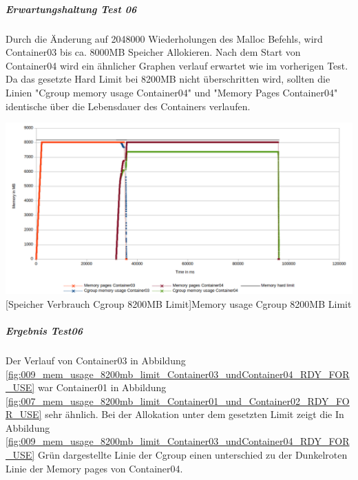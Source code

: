 \vspace{1em}


\subparagraph{Erwartungshaltung Test 06}
Durch die Änderung auf 2048000 Wiederholungen des Malloc Befehls, wird Container03 bis ca. 8000MB Speicher Allokieren. Nach dem Start von Container04 wird ein ähnlicher Graphen verlauf erwartet wie im vorherigen Test. Da das gesetzte Hard Limit bei 8200MB nicht überschritten wird, sollten die Linien "Cgroup memory usage Container04" und "Memory Pages Container04" identische über die Lebensdauer des Containers verlaufen.

\vspace{1em}
\begin{minipage}{\linewidth}
	\centering
	\includegraphics[width=1\linewidth]{pics/009_mem_usage_8200mb_limit_Container03_undContainer04_RDY_FOR_USE.png}
	[Speicher Verbrauch Cgroup 8200MB Limit]{Memory usage Cgroup 8200MB Limit}
	\label{fig:009_mem_usage_8200mb_limit_Container03_undContainer04_RDY_FOR_USE}
\end{minipage}

\subparagraph{Ergebnis Test06}
Der Verlauf von Container03 in Abbildung \ref{fig:009_mem_usage_8200mb_limit_Container03_undContainer04_RDY_FOR_USE} war Container01 in Abbildung \ref{fig:007_mem_usage_8200mb_limit_Container01_und_Container02_RDY_FOR_USE} sehr ähnlich. Bei der Allokation unter dem gesetzten Limit zeigt die In Abbildung \ref{fig:009_mem_usage_8200mb_limit_Container03_undContainer04_RDY_FOR_USE} Grün dargestellte Linie der Cgroup einen unterschied zu der Dunkelroten Linie der Memory pages von Container04. 

